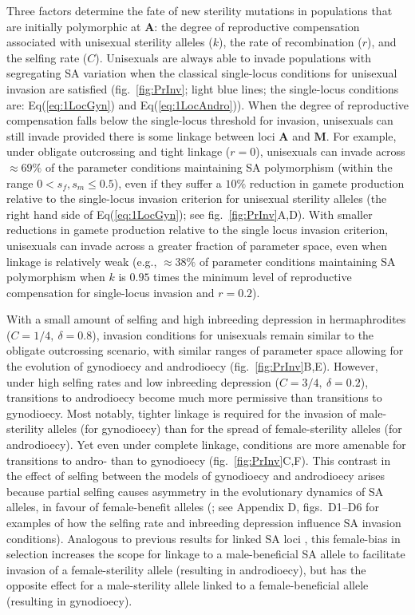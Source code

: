 \documentclass{article}
\begin{document}
Three factors determine the fate of new sterility mutations in populations that are initially polymorphic at $\mathbf{A}$: the degree of reproductive compensation associated with unisexual sterility alleles ($k$), the rate of recombination ($r$), and the selfing rate ($C$). Unisexuals are always able to invade populations with segregating SA variation when the classical single-locus conditions for unisexual invasion are satisfied (fig.~\ref{fig:PrInv}; light blue lines; the single-locus conditions are: Eq(\ref{eq:1LocGyn}) and Eq(\ref{eq:1LocAndro})). When the degree of reproductive compensation falls below the single-locus threshold for invasion, unisexuals can still invade provided there is some linkage between loci $\mathbf{A}$ and $\mathbf{M}$. For example, under obligate outcrossing and tight linkage ($r = 0$), unisexuals can invade across $\approx 69\%$ of the parameter conditions maintaining SA polymorphism (within the range $0 < s_f,s_m \leq 0.5$), even if they suffer a  $10\%$ reduction in gamete production relative to the single-locus invasion criterion for unisexual sterility alleles (the right hand side of Eq(\ref{eq:1LocGyn}); see fig.~\ref{fig:PrInv}A,D). With smaller reductions in gamete production relative to the single locus invasion criterion, unisexuals can invade across a greater fraction of parameter space, even when linkage is relatively weak (e.g., $\approx 38\%$ of parameter conditions maintaining SA polymorphism when $k$ is $0.95$ times the minimum level of reproductive compensation for single-locus invasion and $r = 0.2$). 

With a small amount of selfing and high inbreeding depression in hermaphrodites ($C = 1/4,~\delta = 0.8$), invasion conditions for unisexuals remain similar to the obligate outcrossing scenario, with similar ranges of parameter space allowing for the evolution of gynodioecy and androdioecy (fig.~\ref{fig:PrInv}B,E). However, under high selfing rates and low inbreeding depression ($C = 3/4,~\delta = 0.2$), transitions to androdioecy become much more permissive than transitions to gynodioecy. Most notably, tighter linkage is required for the invasion of male-sterility alleles (for gynodioecy) than for the spread of female-sterility alleles (for androdioecy). Yet even under complete linkage, conditions are more amenable for transitions to andro- than to gynodioecy (fig.~\ref{fig:PrInv}C,F). This contrast in the effect of selfing between the models of gynodioecy and androdioecy arises because partial selfing causes asymmetry in the evolutionary dynamics of SA alleles, in favour of female-benefit alleles (\citealt{ Charlesworth1978a, JordanConnallon2014}; see Appendix D, figs.~D1--D6 for examples of how the selfing rate and inbreeding depression influence SA invasion conditions). Analogous to previous results for linked SA loci \citep{Olito2016}, this female-bias in selection increases the scope for linkage to a male-beneficial SA allele to facilitate invasion of a female-sterility allele (resulting in androdioecy), but has the opposite effect for a male-sterility allele linked to a female-beneficial allele (resulting in gynodioecy).
\end{document}
